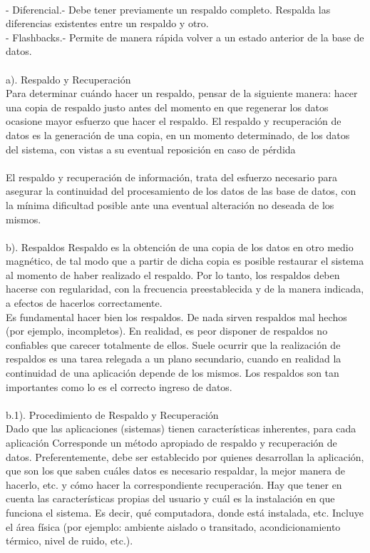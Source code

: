 \begin{enumerate}[3.1.]
\\-	Diferencial.- Debe tener previamente un respaldo completo. Respalda las diferencias existentes entre un respaldo y otro.
\\-	Flashbacks.- Permite de manera rápida volver a un estado anterior de la base de datos.
\\
\\a). Respaldo y Recuperación
\\Para determinar cuándo hacer un respaldo, pensar de la siguiente manera: hacer una copia de respaldo justo antes del momento en que regenerar los datos ocasione mayor esfuerzo que hacer el respaldo.
El respaldo y recuperación de datos es la generación de una copia, en un momento determinado, de los datos del sistema, con vistas a su eventual reposición en caso de pérdida
\\
\\El respaldo y recuperación de información, trata del esfuerzo necesario para asegurar la continuidad del procesamiento de los datos de las base de datos, con la mínima dificultad posible ante una eventual alteración no deseada de los mismos.
\\
\\b). Respaldos
Respaldo es la obtención de una copia de los datos en otro medio magnético, de tal modo que a partir de dicha copia es posible restaurar el sistema al momento de haber realizado el respaldo. Por lo tanto, los respaldos deben hacerse con regularidad, con la frecuencia preestablecida y de la manera indicada, a efectos de hacerlos correctamente.
\\
Es fundamental hacer bien los respaldos. De nada sirven respaldos mal hechos (por ejemplo, incompletos). En realidad, es peor disponer de respaldos no confiables que carecer totalmente de ellos. Suele ocurrir que la realización de respaldos es una tarea relegada a un plano secundario, cuando en realidad la continuidad de una aplicación depende de los mismos. Los respaldos son tan importantes como lo es el correcto ingreso de datos.
\\
\\b.1). Procedimiento de Respaldo y Recuperación
\\Dado que las aplicaciones (sistemas) tienen características inherentes, para cada aplicación
Corresponde un método apropiado de respaldo y recuperación de datos. Preferentemente, debe ser establecido por quienes desarrollan la aplicación, que son los que saben cuáles datos es necesario respaldar, la mejor manera de hacerlo, etc. y cómo hacer la correspondiente recuperación. Hay que tener en cuenta las características propias del usuario y cuál es la instalación en que funciona el sistema. Es decir, qué computadora, donde está instalada, etc. Incluye el área física (por ejemplo: ambiente aislado o transitado, acondicionamiento térmico, nivel de ruido, etc.).  

\end{enumerate}
